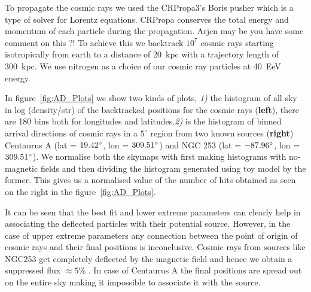 \documentclass[12pt, a4 paper]{article}
\newcommand{\Vasu}[1]{{\color{purple}#1}}
\begin{document}
To propagate the cosmic rays we used the CRPropa3's \cite{CRPropa3_2016} Boris pusher which is a type of solver for Lorentz equations. CRPropa conserves the total energy and momentum of each particle during the propagation.  \Vasu{Arjen may be you have some comment on this ?!}
To achieve this we backtrack $10^7$ cosmic rays starting isotropically from earth to a distance of 20~kpc with a trajectory length of 300~kpc. We use nitrogen as a choice of our cosmic ray particles at 40~EeV energy. 


In figure~\ref{fig:AD_Plots} we show two kinds of plots, \textit{1)} the histogram of all sky in log (density/str) of the backtracked positions for the cosmic rays (\textbf{left}), there are 180 bins both for longitudes and latitudes.\textit{2)} is the histogram of binned arrival directions of cosmic rays in a $5^{\circ}$ region from two known sources (\textbf{right}) Centaurus A (lat = $\rm 19.42^{\circ}$, lon = $\rm 309.51^{\circ}$) and NGC 253 (lat = $\rm -87.96^{\circ}$, lon = $\rm 309.51^{\circ}$).  We normalise both the skymaps with first making histograms with no-magnetic fields and then dividing the histogram generated using toy model by the former. This gives us a normalised value of the number of hits obtained as seen on the right in the figure~\ref{fig:AD_Plots}.

It can be seen that the best fit and lower extreme parameters can clearly help in associating the deflected particles with their potential source. However, in the case of upper extreme parameters any connection between the point of origin of cosmic rays and their final positions is inconclusive. Cosmic rays from  sources like NGC253 get completely deflected by the magnetic field and hence we obtain a suppressed flux $\approx 5\%$ . In case of Centaurus A the final positions are spread out on the entire sky making it impossible to associate it with the source.
\end{document}

